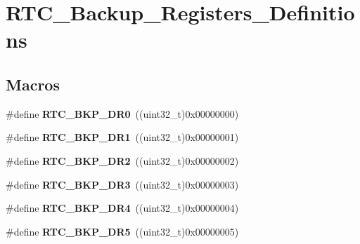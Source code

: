 \hypertarget{group___r_t_c___backup___registers___definitions}{\section{R\-T\-C\-\_\-\-Backup\-\_\-\-Registers\-\_\-\-Definitions}
\label{group___r_t_c___backup___registers___definitions}
}
\subsection*{Macros}
\begin{DoxyCompactItemize}
\item 
\hypertarget{group___r_t_c___backup___registers___definitions_ga519bec4c7714e123cf2664f7394dc1ab}{\#define {\bfseries R\-T\-C\-\_\-\-B\-K\-P\-\_\-\-D\-R0}~((uint32\-\_\-t)0x00000000)}\label{group___r_t_c___backup___registers___definitions_ga519bec4c7714e123cf2664f7394dc1ab}

\item 
\hypertarget{group___r_t_c___backup___registers___definitions_ga6988b61b031e1407787095b0ff214ea8}{\#define {\bfseries R\-T\-C\-\_\-\-B\-K\-P\-\_\-\-D\-R1}~((uint32\-\_\-t)0x00000001)}\label{group___r_t_c___backup___registers___definitions_ga6988b61b031e1407787095b0ff214ea8}

\item 
\hypertarget{group___r_t_c___backup___registers___definitions_ga09963fdfb90ed5b7e32db13671447abb}{\#define {\bfseries R\-T\-C\-\_\-\-B\-K\-P\-\_\-\-D\-R2}~((uint32\-\_\-t)0x00000002)}\label{group___r_t_c___backup___registers___definitions_ga09963fdfb90ed5b7e32db13671447abb}

\item 
\hypertarget{group___r_t_c___backup___registers___definitions_ga014a39228ba4783b62ac8f11929ecd6a}{\#define {\bfseries R\-T\-C\-\_\-\-B\-K\-P\-\_\-\-D\-R3}~((uint32\-\_\-t)0x00000003)}\label{group___r_t_c___backup___registers___definitions_ga014a39228ba4783b62ac8f11929ecd6a}

\item 
\hypertarget{group___r_t_c___backup___registers___definitions_ga97545ebe0827a8650f953c371368f3f5}{\#define {\bfseries R\-T\-C\-\_\-\-B\-K\-P\-\_\-\-D\-R4}~((uint32\-\_\-t)0x00000004)}\label{group___r_t_c___backup___registers___definitions_ga97545ebe0827a8650f953c371368f3f5}

\item 
\hypertarget{group___r_t_c___backup___registers___definitions_gacab50ce68839698c48b8e2e143656ae7}{\#define {\bfseries R\-T\-C\-\_\-\-B\-K\-P\-\_\-\-D\-R5}~((uint32\-\_\-t)0x00000005)}\label{group___r_t_c___backup___registers___definitions_gacab50ce68839698c48b8e2e143656ae7}


\end{DoxyCompactItemize}
